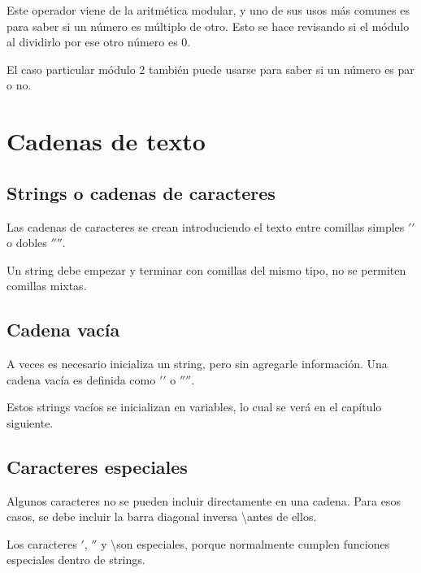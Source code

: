 \documentclass{report}
\begin{document}
{Este operador viene de la aritmética modular, y uno de sus usos más comunes es para saber si un número es múltiplo de otro. Esto se hace revisando si el módulo al dividirlo por ese otro número es 0.


El caso particular módulo 2 también puede usarse para saber si un número es par o no.

\clearpage\chapter{Cadenas de texto}

\section{Strings o cadenas de caracteres}

Las cadenas de caracteres se crean introduciendo el texto entre comillas simples $'$$'$ o dobles $''$$''$.


Un string debe empezar y terminar con comillas del mismo tipo, no se permiten comillas mixtas.


\section{Cadena vacía}

A veces es necesario inicializa un string, pero sin agregarle información. Una cadena vacía es definida como $'$$'$ o $''$$''$.


Estos strings vacíos se inicializan en variables, lo cual se verá en el capítulo siguiente.

\section{Caracteres especiales}

Algunos caracteres no se pueden incluir directamente en una cadena. Para esos casos, se debe incluir la barra diagonal inversa \textbackslash antes de ellos.


Los caracteres $'$, $''$ y \textbackslash son especiales, porque normalmente cumplen funciones especiales dentro de strings.

}
\end{document}
